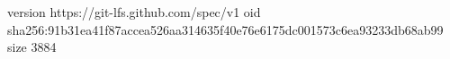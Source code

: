 version https://git-lfs.github.com/spec/v1
oid sha256:91b31ea41f87accea526aa314635f40e76e6175dc001573c6ea93233db68ab99
size 3884
